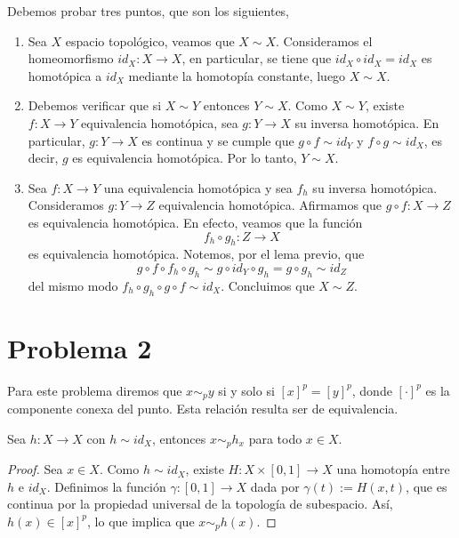 \documentclass{article}
\begin{document}
\noindent Debemos probar tres puntos, que son los siguientes,
\begin{enumerate}
    \item Sea $X$ espacio topológico, veamos que $X\sim X$. Consideramos el homeomorfismo 
    $id_{X}:X\to X$, en particular, se tiene que $id_{X}\circ id_{X}=id_{X}$ es homotópica a 
    $id_{X}$ mediante la homotopía constante, luego $X\sim X$.

    \item Debemos verificar que si $X\sim Y$ entonces $Y\sim X$. Como $X\sim Y$, existe $f:X\to Y$
    equivalencia homotópica, sea $g:Y\to X$ su inversa homotópica. En particular, $g:Y\to X$ es
    continua y se cumple que $g\circ f\sim id_{Y}$ y $f\circ g\sim id_{X}$, es decir, $g$ es 
    equivalencia homotópica. Por lo tanto, $Y\sim X$.

    \item Sea $f:X\to Y$ una equivalencia homotópica y sea $f_{h}$ su inversa homotópica. 
    Consideramos $g:Y\to Z$ equivalencia homotópica. Afirmamos que $g\circ f:X\to Z$ es 
    equivalencia homotópica. En efecto, veamos que la función
    \begin{equation*}
        f_{h}\circ g_{h}:Z\to X
    \end{equation*}
    es equivalencia homotópica. Notemos, por el lema previo, que
    \begin{equation*}
        g\circ f\circ f_{h}\circ g_{h}\sim g\circ id_{Y}\circ g_{h}=g\circ g_{h}\sim id_{Z}
    \end{equation*}
    del mismo modo $f_{h}\circ g_{h}\circ g\circ f\sim id_{X}$. Concluimos que $X\sim Z$.
\end{enumerate}

\section*{Problema 2}
\noindent Para este problema diremos que $x\sim_{p}y$ si y solo si $[x]^{p}=[y]^{p}$, donde 
$[\cdot]^{p}$ es la componente conexa del punto. Esta relación resulta ser de equivalencia.

\begin{lema}
    Sea $h:X\to X$ con $h\sim id_{X}$, entonces $x\sim_{p}h_{x}$ para todo $x\in X$.
\end{lema}
\begin{proof}
    Sea $x\in X$. Como $h\sim id_{X}$, existe $H:X\times [0,1]\to X$ una homotopía entre $h$ e 
    $id_{X}$. Definimos la función $\gamma:[0,1]\to X$ dada por $\gamma(t):=H(x,t)$, que es 
    continua por la propiedad universal de la topología de subespacio. Así, $h(x)\in[x]^{p}$, lo
    que implica que $x\sim_{p}h(x)$.
\end{proof}
\end{document}
